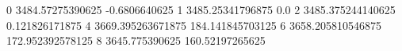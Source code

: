 0 3484.57275390625 -0.6806640625
1 3485.25341796875 0.0
2 3485.375244140625 0.121826171875
4 3669.395263671875 184.141845703125
6 3658.205810546875 172.952392578125
8 3645.775390625 160.52197265625
